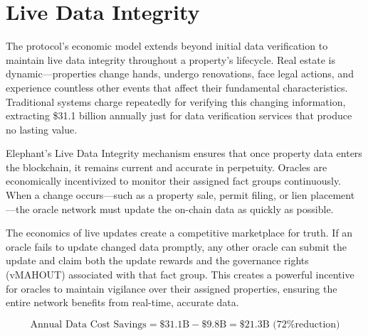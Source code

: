 \section{Live Data Integrity}

The protocol's economic model extends beyond initial data verification to maintain live data integrity throughout a property's lifecycle. Real estate is dynamic—properties change hands, undergo renovations, face legal actions, and experience countless other events that affect their fundamental characteristics. Traditional systems charge repeatedly for verifying this changing information, extracting \$31.1 billion annually just for data verification services that produce no lasting value.

Elephant's Live Data Integrity mechanism ensures that once property data enters the blockchain, it remains current and accurate in perpetuity. Oracles are economically incentivized to monitor their assigned fact groups continuously. When a change occurs—such as a property sale, permit filing, or lien placement—the oracle network must update the on-chain data as quickly as possible.

The economics of live updates create a competitive marketplace for truth. If an oracle fails to update changed data promptly, any other oracle can submit the update and claim both the update rewards and the governance rights (vMAHOUT) associated with that fact group. This creates a powerful incentive for oracles to maintain vigilance over their assigned properties, ensuring the entire network benefits from real-time, accurate data.

\[
\text{Annual Data Cost Savings} = \$31.1\text{B} - \$9.8\text{B} = \$21.3\text{B} \text{ (72\% reduction)}
\]

